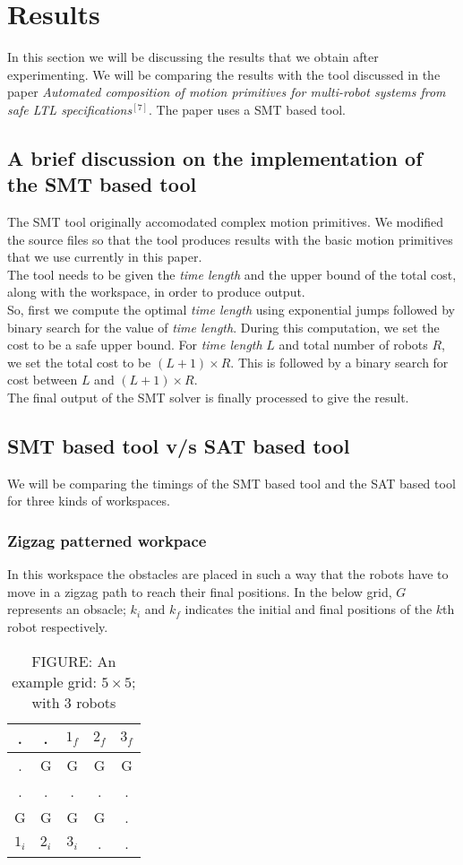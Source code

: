 \documentclass{article}[11pt]
\begin{document}
	\section{Results}
		In this section we will be discussing the results that we obtain after experimenting. We will be comparing the results with the tool discussed in the paper \textit{Automated composition of motion primitives for multi-robot systems from safe LTL specifications}$^{[7]}$. The paper uses a SMT based tool.
		\subsection{A brief discussion on the implementation of the SMT based tool}
		The SMT tool originally accomodated complex motion primitives. We modified the source files so that the tool produces results with the basic motion primitives that we use currently in this paper.\\
		The tool needs to be given the \textit{time length} and the upper bound of the total cost, along with the workspace, in order to produce output.\\
		So, first we compute the optimal \textit{time length} using exponential jumps followed by binary search for the value of \textit{time length}. During this computation, we set the cost to be a safe upper bound. For \textit{time length} $L$ and total number of robots $R$, we set the total cost to be $(L+1) \times R$. This is followed by a binary search for cost between $L$ and $(L+1) \times R$.\\
		The final output of the SMT solver is finally processed to give the result.
		\subsection{SMT based tool v/s SAT based tool}
		We will be comparing the timings of the SMT based tool and the SAT based tool for three kinds of workspaces.
			\subsubsection{Zigzag patterned workpace}
			In this workspace the obstacles are placed in such a way that the robots have to move in a zigzag path to reach their final positions. In the below grid, $G$ represents an obsacle; $k_i$ and $k_f$ indicates the initial and final positions of the $k$th robot respectively.
				\begin{table}[h!]
				\centering
				\begin{tabular}{| c | c | c | c | c |} 
				 \hline
				 . & . & $1_f$ & $2_f$ & $3_f$ \\ 
				 \hline
				 . & G & G & G & G \\
				 \hline
				 . & . & . & . & . \\
				 \hline
				 G & G & G & G & . \\
				 \hline
				 $1_i$ & $2_i$ & $3_i$ & . & . \\ [1ex] 
				 \hline
				\end{tabular}
				\caption*{FIGURE: An example grid: $5\times 5$; with 3 robots}
				\end{table}
\end{document}
